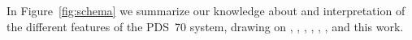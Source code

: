 \documentclass[longauth]{aa}
\begin{document}
\begin{appendix}
In Figure~\ref{fig:schema} we summarize our knowledge about and interpretation of the different features of the PDS~70 system, drawing on \citet{Keppler2018, Keppler2019}, %
\citet{Mesa2019a}, \citet{Isella2019}, \citet{Benisty2021}, \citet{Casassus2022}, \citet{Wang2021}, and this work.


\end{appendix}
\end{document}
